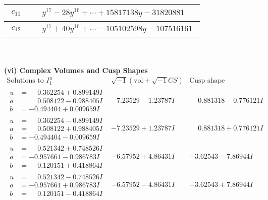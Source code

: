 \documentclass[1p]{elsarticle_modified}
\theoremstyle{definition}
\newcommand{\I}{\sqrt{-1}}
\begin{document}
\begin{tabular}{m{50pt}|m{274pt}}
\hline $$\begin{aligned}c_{11}\end{aligned}$$&$\begin{aligned}
&y^{17}-28 y^{16}+\cdots+15817138 y-31820881
\end{aligned}$\\
\hline $$\begin{aligned}c_{12}\end{aligned}$$&$\begin{aligned}
&y^{17}+40 y^{16}+\cdots-105102598 y-107516161
\end{aligned}$\\
\hline
\end{tabular}\\~\\
\newpage\flushleft \textbf{(vi) Complex Volumes and Cusp Shapes}
$$\begin{array}{c|c|c}  
\text{Solutions to }I^u_{1}& \I (\text{vol} + \sqrt{-1}CS) & \text{Cusp shape}\\
 \hline 
\begin{aligned}
u &= \phantom{-}0.362254 + 0.899149 I \\
a &= \phantom{-}0.508122 - 0.988405 I \\
b &= -0.494404 + 0.009659 I\end{aligned}
 & -7.23529 - 1.23787 I & \phantom{-}0.881318 - 0.776121 I \\ \hline\begin{aligned}
u &= \phantom{-}0.362254 - 0.899149 I \\
a &= \phantom{-}0.508122 + 0.988405 I \\
b &= -0.494404 - 0.009659 I\end{aligned}
 & -7.23529 + 1.23787 I & \phantom{-}0.881318 + 0.776121 I \\ \hline\begin{aligned}
u &= \phantom{-}0.521342 + 0.748526 I \\
a &= -0.957661 - 0.986783 I \\
b &= \phantom{-}0.120151 + 0.418864 I\end{aligned}
 & -6.57952 + 4.86431 I & -3.62543 - 7.86944 I \\ \hline\begin{aligned}
u &= \phantom{-}0.521342 - 0.748526 I \\
a &= -0.957661 + 0.986783 I \\
b &= \phantom{-}0.120151 - 0.418864 I\end{aligned}
 & -6.57952 - 4.86431 I & -3.62543 + 7.86944 I \\ \hline\begin{aligned}

\end{aligned}
\end{array}$$
\end{document}
